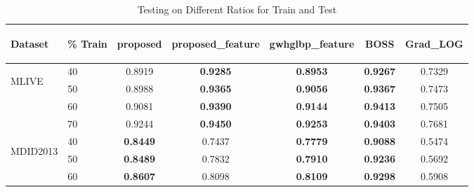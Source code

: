 \documentclass{article}
\begin{document}
\begin{table}
\scriptsize
\caption{Testing on Different Ratios for Train and Test}
\label{tbl:portion}
\begin{tabular}{||l|l||ccccc||}
\toprule
\toprule
\begin{turn}{-90}\textbf{Dataset}\end{turn}&\begin{turn}{-90}\textbf{\% Train}\end{turn}&\begin{turn}{-90}\textbf{proposed}\end{turn}&\begin{turn}{-90}\textbf{proposed\_feature}\end{turn}&\begin{turn}{-90}\textbf{gwhglbp\_feature}\end{turn}&\begin{turn}{-90}\textbf{BOSS}\end{turn}&\begin{turn}{-90}\textbf{Grad\_LOG}\end{turn}\\
\midrule
\midrule
\multirow{4}{*}{\begin{turn}{-90}MLIVE\end{turn}}&40&0.8919&\textcolor[rgb]{1,0,0}{\textbf{0.9285}}&\textbf{0.8953}&\textcolor[rgb]{0,0,1}{\textbf{0.9267}}&0.7329\\
\cmidrule{2-7}
&50&0.8988&\textcolor[rgb]{0,0,1}{\textbf{0.9365}}&\textbf{0.9056}&\textcolor[rgb]{1,0,0}{\textbf{0.9367}}&0.7473\\
\cmidrule{2-7}
&60&0.9081&\textcolor[rgb]{0,0,1}{\textbf{0.9390}}&\textbf{0.9144}&\textcolor[rgb]{1,0,0}{\textbf{0.9413}}&0.7505\\
\cmidrule{2-7}
&70&0.9244&\textcolor[rgb]{1,0,0}{\textbf{0.9450}}&\textbf{0.9253}&\textcolor[rgb]{0,0,1}{\textbf{0.9403}}&0.7681\\
\midrule \midrule
\multirow{4}{*}{\begin{turn}{-90}MDID2013\end{turn}}&40&\textcolor[rgb]{0,0,1}{\textbf{0.8449}}&0.7437&\textbf{0.7779}&\textcolor[rgb]{1,0,0}{\textbf{0.9088}}&0.5474\\
\cmidrule{2-7}
&50&\textcolor[rgb]{0,0,1}{\textbf{0.8489}}&0.7832&\textbf{0.7910}&\textcolor[rgb]{1,0,0}{\textbf{0.9236}}&0.5692\\
\cmidrule{2-7}
&60&\textcolor[rgb]{0,0,1}{\textbf{0.8607}}&0.8098&\textbf{0.8109}&\textcolor[rgb]{1,0,0}{\textbf{0.9298}}&0.5908\\

\end{tabular}
\end{table}
\end{document}
